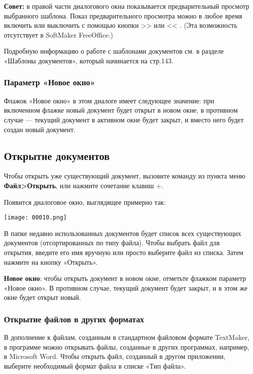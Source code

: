 \documentclass[a4paper,10pt]{article}
\begin{document}
\begin{mdframed}[backgroundcolor=blue!10]
\textbf{Совет:} в правой части диалогового окна показывается предварительный просмотр выбранного шаблона. Показ предварительного просмотра можно в любое время включить или выключить с помощью кнопки >> или << . (Эта возможность отсутствует в SoftMaker FreeOffice.) 
\end{mdframed}

Подробную информацию о работе с шаблонами документов см. в разделе «Шаблоны документов», который начинается на стр.143.

\subsubsection{Параметр «Новое окно»}
Флажок «Новое окно» в этом диалоге имеет следующее значение: при включенном флажке новый документ будет открыт в новом окне, в противном случае — текущий документ в активном окне будет закрыт, и вместо него будет создан новый документ.

\subsection{Открытие документов}
Чтобы открыть уже существующий документ, вызовите команду из пункта меню \textbf{Файл>Открыть}, или нажмите сочетание клавиш +.

Появится диалоговое окно, выглядящее примерно так: 

\texttt{[image: 00010.png]}

В папке недавно использованных документов будет список всех существующих документов (отсортированных по типу файла). Чтобы выбрать файл для открытия, введите его имя вручную или просто выберите файл из списка. Затем нажмите на кнопку «Открыть».

\textbf{Новое окно}: чтобы открыть документ в новом окне, отметьте флажком параметр «Новое окно». В противном случае, текущий документ будет закрыт, и в этом же окне будет открыт новый.

\subsubsection{Открытие файлов в других форматах}
В дополнение к файлам, созданным в стандартном файловом формате TextMaker, в программе можно открывать файлы, созданные в других программах, например, в Microsoft Word. Чтобы открыть файл, созданный в другом приложении,  выберите необходимый формат файла в списке «Тип файла». 
\end{document}
